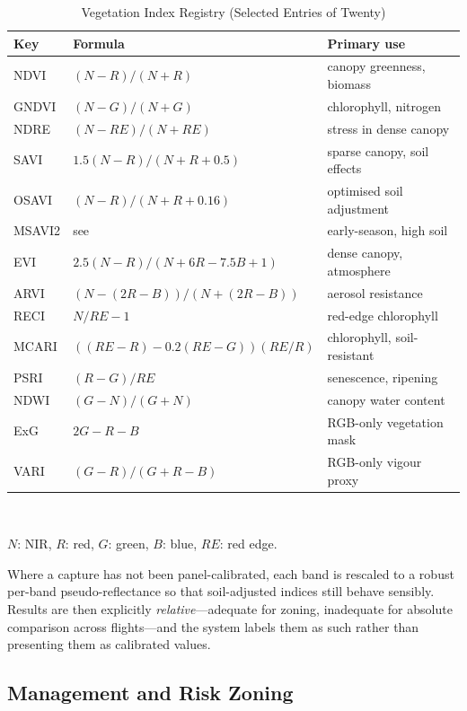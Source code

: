 \documentclass[conference]{IEEEtran}
\begin{document}
\begin{table}[!t]
\caption{Vegetation Index Registry (Selected Entries of Twenty)}
\label{tab:indices}
\centering
\footnotesize
\begin{tabular}{@{}llp{2.6cm}@{}}
\toprule
Key & Formula & Primary use \\
\midrule
NDVI  & $(N-R)/(N+R)$              & canopy greenness, biomass \\
GNDVI & $(N-G)/(N+G)$              & chlorophyll, nitrogen \\
NDRE  & $(N-RE)/(N+RE)$            & stress in dense canopy \\
SAVI  & $1.5(N-R)/(N+R+0.5)$       & sparse canopy, soil effects \\
OSAVI & $(N-R)/(N+R+0.16)$         & optimised soil adjustment \\
MSAVI2& see \cite{qi1994}          & early-season, high soil \\
EVI   & $2.5(N-R)/(N+6R-7.5B+1)$   & dense canopy, atmosphere \\
ARVI  & $(N-(2R-B))/(N+(2R-B))$    & aerosol resistance \\
RECI  & $N/RE - 1$                 & red-edge chlorophyll \\
MCARI & $((RE-R)-0.2(RE-G))(RE/R)$ & chlorophyll, soil-resistant \\
PSRI  & $(R-G)/RE$                 & senescence, ripening \\
NDWI  & $(G-N)/(G+N)$              & canopy water content \\
ExG   & $2G-R-B$                   & RGB-only vegetation mask \\
VARI  & $(G-R)/(G+R-B)$            & RGB-only vigour proxy \\
\bottomrule
\end{tabular}
\\[2pt]
\raggedright\scriptsize $N$: NIR, $R$: red, $G$: green, $B$: blue, $RE$: red edge.
\end{table}

Where a capture has not been panel-calibrated, each band is rescaled to a
robust per-band pseudo-reflectance so that soil-adjusted indices still behave
sensibly. Results are then explicitly \emph{relative}---adequate for zoning,
inadequate for absolute comparison across flights---and the system labels them
as such rather than presenting them as calibrated values.

\subsection{Management and Risk Zoning}
\end{document}
